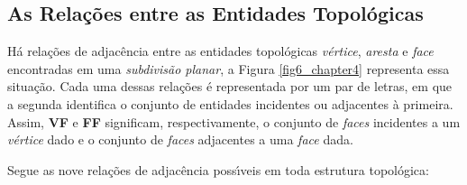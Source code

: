 \documentclass[12pt,a4paper]{book}
\begin{document}
\subsection{As Rela\c{c}\~{o}es entre as Entidades Topol\'{o}gicas}

H\'{a} rela\c{c}\~{o}es de adjac\^{e}ncia entre as entidades topol\'{o}gicas 
\textit{v\'{e}rtice}, \textit{aresta} e \textit{face} encontradas em uma \textit{subdivis\~{a}o planar}, a Figura \ref{fig6_chapter4} representa essa situa\c{c}\~{a}o. Cada uma dessas rela\c{c}\~{o}es \'{e} representada por um par de letras, em que a segunda identifica o conjunto de entidades incidentes ou adjacentes 
\`{a} primeira. Assim, \textbf{VF} e \textbf{FF} significam, respectivamente, o conjunto de \textit{faces} incidentes a um \textit{v\'{e}rtice} dado e o conjunto de \textit{faces} adjacentes a uma \textit{face} dada.

Segue as nove rela\c{c}\~{o}es de adjac\^{e}ncia poss\'{\i}veis em
toda estrutura topol\'{o}gica:
\end{document}
